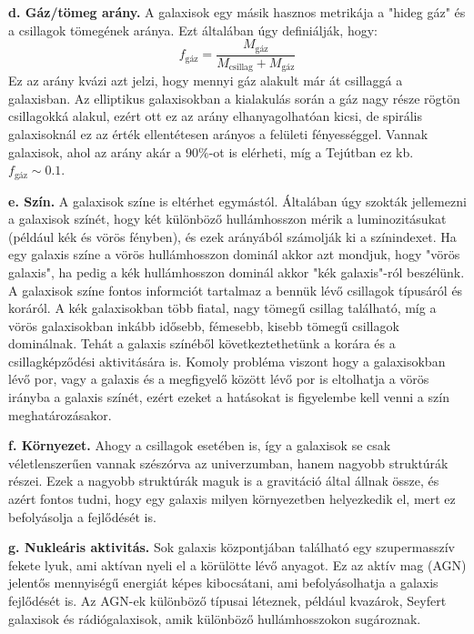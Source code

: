 \documentclass[../main.tex]{subfiles}
\begin{document}
\textbf{d. Gáz/tömeg arány.} A galaxisok egy másik hasznos metrikája a "hideg gáz" és a csillagok tömegének aránya. Ezt általában úgy definiálják, hogy:
\begin{equation}
    f_\text{gáz} = \frac{M_\text{gáz}}{M_\text{csillag} + M_\text{gáz}}
\end{equation}
Ez az arány kvázi azt jelzi, hogy mennyi gáz alakult már át csillaggá a galaxisban. Az elliptikus galaxisokban a kialakulás során a gáz nagy része rögtön csillagokká alakul, ezért ott ez az arány elhanyagolhatóan kicsi,
de spirális galaxisoknál ez az érték ellentétesen arányos a felületi fényességgel. Vannak galaxisok, ahol az arány akár a $90\%$-ot is elérheti, míg a Tejútban ez kb. $f_\text{gáz} \sim 0.1$.

\textbf{e. Szín.} A galaxisok színe is eltérhet egymástól. Általában úgy szokták jellemezni a galaxisok színét, hogy két különböző hullámhosszon mérik a luminozitásukat (például kék és vörös fényben),
és ezek arányából számolják ki a színindexet. Ha egy galaxis színe a vörös hullámhosszon dominál akkor azt mondjuk, hogy "vörös galaxis", ha pedig a kék hullámhosszon dominál akkor "kék galaxis"-ról beszélünk.
A galaxisok színe fontos informciót tartalmaz a bennük lévő csillagok típusáról és koráról. A kék galaxisokban több fiatal, nagy tömegű csillag található, míg a vörös galaxisokban inkább idősebb, fémesebb, kisebb tömegű csillagok dominálnak.
Tehát a galaxis színéből következtethetünk a korára és a csillagképződési aktivitására is. Komoly probléma viszont hogy a galaxisokban lévő por, vagy a galaxis és a megfigyelő között lévő por is eltolhatja a vörös irányba a galaxis színét,
ezért ezeket a hatásokat is figyelembe kell venni a szín meghatározásakor.

\textbf{f. Környezet.} Ahogy a csillagok esetében is, így a galaxisok se csak véletlenszerűen vannak szészórva az univerzumban, hanem nagyobb struktúrák részei. Ezek a nagyobb struktúrák maguk is 
a gravitáció által állnak össze, és azért fontos tudni, hogy egy galaxis milyen környezetben helyezkedik el, mert ez befolyásolja a fejlődését is.

\textbf{g. Nukleáris aktivitás.} Sok galaxis központjában található egy szupermasszív fekete lyuk, ami aktívan nyeli el a körülötte lévő anyagot. Ez az aktív mag (AGN) jelentős mennyiségű energiát képes kibocsátani,
ami befolyásolhatja a galaxis fejlődését is. Az AGN-ek különböző típusai léteznek, például kvazárok, Seyfert galaxisok és rádiógalaxisok, amik különböző hullámhosszokon sugároznak.
\end{document}
